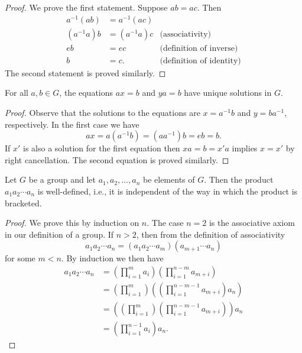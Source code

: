 \begin{proof}
    We prove the first statement. Suppose \(ab = ac\). Then
    \begin{align*}
        a^{-1}(ab) &= a^{-1}(ac) &\\
        (a^{-1}a)b &= (a^{-1}a)c &\text{(associativity)}\\
        eb &= ec &\text{(definition of inverse)}\\
        b &= c. &\text{(definition of identity)}
    \end{align*}
    The second statement is proved similarly.
\end{proof}

\begin{corollary}
    For all \(a, b \in G\), the equations \(ax = b\) and \(ya = b\) have unique
    solutions in \(G\).
\end{corollary}

\begin{proof}
    Observe that the solutions to the equations are \(x = a^{-1}b\) and \(y =
    ba^{-1}\), respectively. In the first case we have
    \[
        ax = a(a^{-1}b) = (aa^{-1})b = eb = b.
    \]
    If \(x'\) is also a solution for the first equation then \(xa = b = x'a\)
    implies \(x = x'\) by right cancellation. The second equation is proved
    similarly.
\end{proof}

\begin{theorem}
    \label{thm:generalized-associative-law}
    Let \(G\) be a group and let \(a_1, a_2, \ldots, a_n\) be elements of \(G\).
    Then the product \(a_1 a_2 \cdots a_n\) is well-defined, i.e., it is
    independent of the way in which the product is bracketed.
\end{theorem}

\begin{proof}
    We prove this by induction on \(n\). The case \(n = 2\) is the associative
    axiom in our definition of a group. If \(n > 2\), then from the definition
    of associativity
    \[
        a_1 a_2 \cdots a_n = (a_1 a_2 \cdots a_m)(a_{m + 1} \cdots a_n)
    \]
    for some \(m < n\). By induction we then have
    \begin{align*}
        a_1 a_2 \cdots a_n & = \left(\prod_{i = 1}^m a_i\right)\left(\prod_{i = 1}^{n - m} a_{m + i}\right)\\
        & = \left(\prod_{i =1}^{m}\right)\left(\left(\prod_{i = 1}^{n - m - 1} a_{m + i}\right)a_n\right)\\
        & = \left(\left(\prod_{i = 1}^{m}\right)\left(\prod_{i = 1}^{n - m- 1} a_{m + i}\right)\right)a_n\\
        & = \left(\prod_{i = 1}^{n - 1} a_i\right)a_n.
    \end{align*}
\end{proof}

